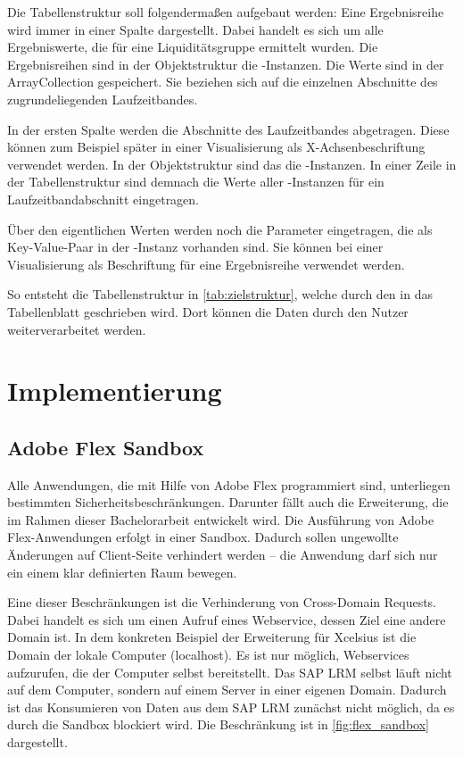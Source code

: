\begin{onehalfspacing}
Die Tabellenstruktur soll folgendermaßen aufgebaut werden: Eine Ergebnisreihe wird immer in einer Spalte dargestellt. Dabei handelt es sich um alle Ergebniswerte, die für eine Liquiditätsgruppe ermittelt wurden. Die Ergebnisreihen sind in der Objektstruktur die -Instanzen. Die Werte sind in der ArrayCollection  gespeichert. Sie beziehen sich auf die einzelnen Abschnitte des zugrundeliegenden Laufzeitbandes.

In der ersten Spalte werden die Abschnitte des Laufzeitbandes abgetragen. Diese können zum Beispiel später in einer Visualisierung als X-Achsenbeschriftung verwendet werden. In der Objektstruktur sind das die -Instanzen. In einer Zeile in der Tabellenstruktur sind demnach die Werte aller -Instanzen für ein Laufzeitbandabschnitt eingetragen.

Über den eigentlichen Werten werden noch die Parameter eingetragen, die als Key-Value-Paar in der -Instanz vorhanden sind. Sie können bei einer Visualisierung als Beschriftung für eine Ergebnisreihe verwendet werden.

So entsteht die Tabellenstruktur in \vref{tab:zielstruktur}, welche durch den  in das Tabellenblatt geschrieben wird. Dort können die Daten durch den Nutzer weiterverarbeitet werden.

\section{Implementierung}
\subsection{Adobe Flex Sandbox}
Alle Anwendungen, die mit Hilfe von Adobe Flex programmiert sind, unterliegen bestimmten Sicherheitsbeschränkungen. Darunter fällt auch die Erweiterung, die im Rahmen dieser Bachelorarbeit entwickelt wird. Die Ausführung von Adobe Flex-Anwendungen erfolgt in einer Sandbox. Dadurch sollen ungewollte Änderungen auf Client-Seite verhindert werden -- die Anwendung darf sich nur ein einem klar definierten Raum bewegen.

Eine dieser Beschränkungen ist die Verhinderung von Cross-Domain Requests. Dabei handelt es sich um einen Aufruf eines Webservice, dessen Ziel eine andere Domain ist. In dem konkreten Beispiel der Erweiterung für \gls{Xcelsius} ist die Domain der lokale Computer (localhost). Es ist nur möglich, Webservices aufzurufen, die der Computer selbst bereitstellt. Das SAP LRM selbst läuft nicht auf dem Computer, sondern auf einem Server in einer eigenen Domain. Dadurch ist das Konsumieren von Daten aus dem SAP LRM zunächst nicht möglich, da es durch die Sandbox blockiert wird. Die Beschränkung ist in \vref{fig:flex_sandbox} dargestellt.


\end{onehalfspacing}
